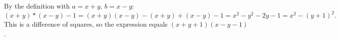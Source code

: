 By the definition with $a=x+y$, $b=x-y$:
\[
(x+y)*(x-y)-1=(x+y)(x-y)-(x+y)+(x-y)-1=x^2-y^2-2y-1=x^2-(y+1)^2 .
\]
This is a difference of squares, so the expression equals $\boxed{(x+y+1)(x-y-1)}$.
